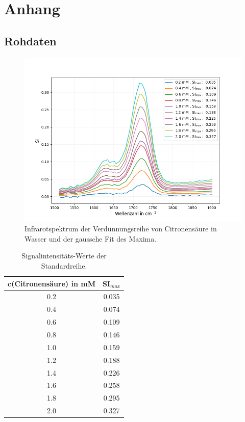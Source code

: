 \documentclass[10pt,a4paper]{article}
\begin{document}
		
	\section{Anhang}
		\subsection{Rohdaten}
		
			\begin{figure}[H]
				\centering
				\includegraphics[scale=0.55]{Standardcurve_citricacid.png}
				\caption{Infrarotspektrum der Verdünnungsreihe von Citronensäure in Wasser und der gaussche Fit des Maxima.}
				\label{fig:IR_Standardcurve}
			\end{figure}
			
			\begin{table}[H]
				\centering
				\caption{Signalintensitäts-Werte der Standardreihe.}
				\label{tab:r_square_standardcurve}
				\begin{tabular}{cc}
					\toprule
					c(Citronensäure) in mM & SI$_{max}$\\
					\midrule
					0.2	&0.035\\
					0.4	&0.074\\
					0.6	&0.109\\
					0.8	&0.146\\
					1.0	&0.159\\
					1.2	&0.188\\
					1.4	&0.226\\
					1.6	&0.258\\
					1.8	&0.295\\
					2.0	&0.327\\
					\bottomrule
				\end{tabular}
			\end{table}	
			
\end{document}
